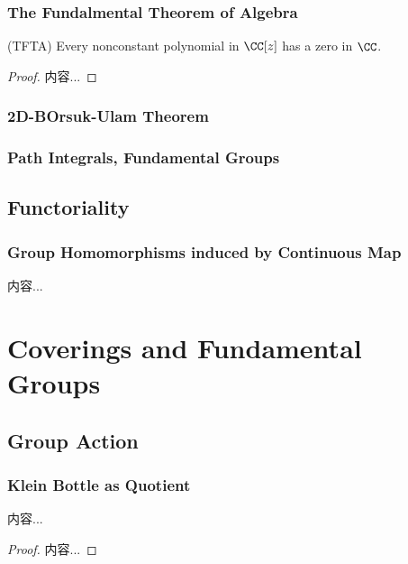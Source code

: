 \documentclass[Total.tex]{subfiles}
\begin{document}
	\subsubsection{The Fundalmental Theorem of Algebra}
	\begin{theorem}
		(TFTA) Every nonconstant polynomial in $\CC[z]$ has a zero in $\CC$.
	\end{theorem}
	\begin{proof}
		内容...
	\end{proof}
	\subsubsection{2D-BOrsuk-Ulam Theorem}
	\subsubsection{Path Integrals, Fundamental Groups}
	\subsection{Functoriality}
	\subsubsection{Group Homomorphisms induced by Continuous Map}
	\begin{Def}
		内容...
	\end{Def}
	\section{Coverings and Fundamental Groups}
	\subsection{Group Action}
	\subsubsection{Klein Bottle as Quotient}
	\begin{lemma}
		内容...
	\end{lemma}
	\begin{proof}
		内容...
	\end{proof}
\end{document}
